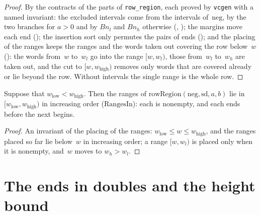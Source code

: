 \begin{proof}
  \leanok
  By the contracts of the parts of \texttt{row\_region}, each proved by \texttt{vcgen} with a named
  invariant: the excluded intervals come from the intervals of~$\mathrm{neg}$, by the two branches
  for $a > 0$ and by $B n_l$ and $B n_h$ otherwise (,
  ); the margins move each end
  (); the insertion sort only permutes the pairs of ends
  (); and the placing of the ranges keeps the ranges and the
  words taken out covering the row below~$w$ (): the words
  from~$w$ to~$w_l$ go into the range $[w, w_l)$, those from~$w_l$ to~$w_h$ are taken out, and the
  cut to $[w, w_{\mathrm{high}})$ removes only words that are covered already or lie beyond the
  row. Without intervals the single range is the whole row.
\end{proof}

\begin{lemma}\label{lem:rowRegion_spec}
  \leanok
  Suppose that $w_{\mathrm{low}} < w_{\mathrm{high}}$. Then the ranges of
  $\mathrm{rowRegion}(\mathrm{neg}, \mathrm{sd}, a, b)$ lie in $[w_{\mathrm{low}},
  w_{\mathrm{high}})$ in increasing order ($\mathrm{RangesIn}$): each is nonempty, and each ends
  before the next begins.
\end{lemma}

\begin{proof}
  \leanok
  An invariant of the placing of the ranges: $w_{\mathrm{low}} \le w \le w_{\mathrm{high}}$, and the
  ranges placed so far lie below~$w$ in increasing order; a range $[w, w_l)$ is placed only when it
  is nonempty, and~$w$ moves to $w_h > w_l$.
\end{proof}

\section{The ends in doubles and the height bound}\label{sec:rowRegionEnds}

